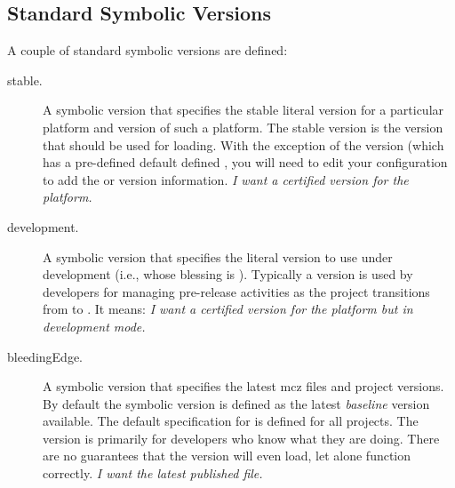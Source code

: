 \documentclass[a4paper,10pt,twoside]{book}
\begin{document}
\subsection{Standard Symbolic Versions}

A couple of standard symbolic versions are defined:

\begin{description}
\item[stable.] A symbolic version that specifies the stable literal version for a particular platform and version of such a platform. The stable version is the version that should be used for loading. With the exception of the  version (which has a pre-defined default defined%
, you will need to edit your configuration to add the  or  version information. \emph{I want a certified version for the platform.}

\item[development.] A symbolic version that specifies the literal version to use under development (i.e., whose blessing is ). Typically a  version is used by developers for managing pre-release activities as the project transitions from  to . %
It means: \emph{I want a certified version for the platform but in development mode.}



\item[bleedingEdge.]  A symbolic version that specifies the latest mcz files and project versions. By default the  symbolic version is defined as the latest \emph{baseline} version available. The default specification for  is defined for all projects. The  version is primarily for developers who know what they are doing. There are no guarantees that the  version will even load, let alone function correctly. \emph{I want the latest published file.}

\end{description}
\end{document}
